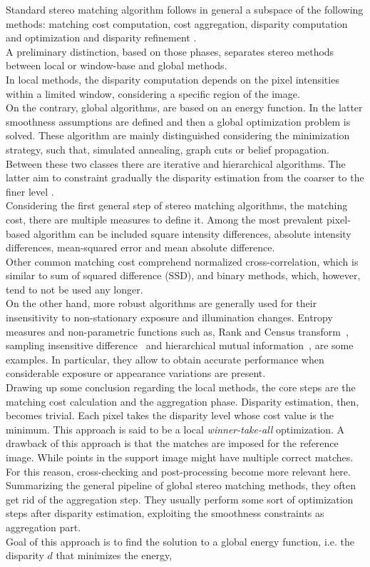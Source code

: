 Standard stereo matching algorithm follows in general a subspace of the following methods: matching cost computation, cost aggregation, disparity computation and optimization and disparity refinement \cite{Scharstein2001}.\\
A preliminary distinction, based on those phases, separates stereo methods between local or window-base and global methods.\\
In local methods, the disparity computation depends on the pixel intensities within a limited window, considering a specific region of the image.\\
On the contrary, global algorithms, are based on an energy function.
In the latter smoothness assumptions are defined and then a global optimization problem is solved. 
These algorithm are mainly distinguished considering the minimization strategy, such that, simulated annealing, graph cuts or belief propagation.\\
Between these two classes there are iterative and hierarchical algorithms. 
The latter aim to constraint gradually the disparity estimation from the coarser to the finer level \cite{Hirschmuller2008}.\\
Considering the first general step of stereo matching algorithms, the matching cost, there are multiple measures to define it.
Among the most prevalent pixel-based algorithm can be included square intensity differences, absolute intensity differences, mean-squared error and mean absolute difference.\\
Other common matching cost comprehend normalized cross-correlation, which is similar to sum of squared difference (SSD), and binary methods, which, however, tend to not be used any longer. \\
On the other hand, more robust algorithms are generally used for their insensitivity to non-stationary exposure and illumination changes. 
Entropy measures and non-parametric functions such as, Rank and Census transform~\cite{Zabih1994}, sampling insensitive difference~\cite{Birchfield1999} and hierarchical mutual information~\cite{Hirschmuller2008}, are some examples.
In particular, they allow to obtain accurate performance when considerable exposure or appearance variations are present. \\
Drawing up some conclusion regarding the local methods, the core steps are the matching cost calculation and the aggregation phase. 
Disparity estimation, then, becomes trivial. 
Each pixel takes the disparity level whose cost value is the minimum. 
This approach is said to be a local \textit{winner-take-all} optimization. 
A drawback of this approach is that the matches are imposed for the reference image. 
While points in the support image might have multiple correct matches. 
For this reason, cross-checking and post-processing become more relevant here.\\
Summarizing the general pipeline of global stereo matching methods, they often get rid of the aggregation step. 
They usually perform some sort of optimization steps after disparity estimation, exploiting the smoothness constraints as aggregation part. \\
Goal of this approach is to find the solution to a global energy function, i.e. the disparity $d$ that minimizes the energy,

